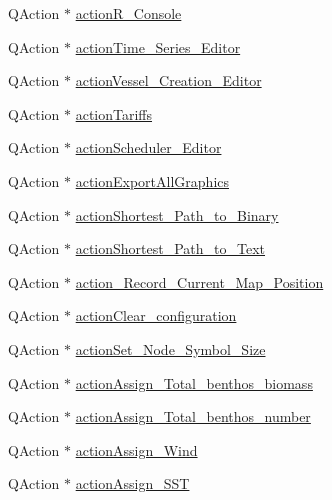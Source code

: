 \begin{DoxyCompactItemize}
\item 
Q\+Action $\ast$ \mbox{\hyperlink{class_ui___main_window_a132a1368e69983ae3fe5c0cb2d87704b}{action\+R\+\_\+\+Console}}
\item 
Q\+Action $\ast$ \mbox{\hyperlink{class_ui___main_window_a6eda9a1f26b29e60df9d0c9b6cfd4619}{action\+Time\+\_\+\+Series\+\_\+\+Editor}}
\item 
Q\+Action $\ast$ \mbox{\hyperlink{class_ui___main_window_a1153cec874e0809af0c2a92401f1992a}{action\+Vessel\+\_\+\+Creation\+\_\+\+Editor}}
\item 
Q\+Action $\ast$ \mbox{\hyperlink{class_ui___main_window_abfc0b361694c7613f551bd2fd69cc7d3}{action\+Tariffs}}
\item 
Q\+Action $\ast$ \mbox{\hyperlink{class_ui___main_window_a2f41da4d27897a949def5063cfaeb673}{action\+Scheduler\+\_\+\+Editor}}
\item 
Q\+Action $\ast$ \mbox{\hyperlink{class_ui___main_window_a9bb4a2e998e88eb450488b6a5260bce8}{action\+Export\+All\+Graphics}}
\item 
Q\+Action $\ast$ \mbox{\hyperlink{class_ui___main_window_aad24ec2e8eab1824841e8aa0f5b87a9f}{action\+Shortest\+\_\+\+Path\+\_\+to\+\_\+\+Binary}}
\item 
Q\+Action $\ast$ \mbox{\hyperlink{class_ui___main_window_a6509a76816bf801bfb93750973f6a878}{action\+Shortest\+\_\+\+Path\+\_\+to\+\_\+\+Text}}
\item 
Q\+Action $\ast$ \mbox{\hyperlink{class_ui___main_window_afaa08ad05b036e6672cf172424cea79d}{action\+\_\+\+Record\+\_\+\+Current\+\_\+\+Map\+\_\+\+Position}}
\item 
Q\+Action $\ast$ \mbox{\hyperlink{class_ui___main_window_a5ef1318a9ff022383c88327750b1318a}{action\+Clear\+\_\+configuration}}
\item 
Q\+Action $\ast$ \mbox{\hyperlink{class_ui___main_window_aa8902a1f75360341c879453c5e053893}{action\+Set\+\_\+\+Node\+\_\+\+Symbol\+\_\+\+Size}}
\item 
Q\+Action $\ast$ \mbox{\hyperlink{class_ui___main_window_ae5ee462918aeef0e0734ecb128eb2e61}{action\+Assign\+\_\+\+Total\+\_\+benthos\+\_\+biomass}}
\item 
Q\+Action $\ast$ \mbox{\hyperlink{class_ui___main_window_a044aefa7e8836f265f0b37c4d1e63e42}{action\+Assign\+\_\+\+Total\+\_\+benthos\+\_\+number}}
\item 
Q\+Action $\ast$ \mbox{\hyperlink{class_ui___main_window_aa277c91c1519ef0bb00d49e7cced878b}{action\+Assign\+\_\+\+Wind}}
\item 
Q\+Action $\ast$ \mbox{\hyperlink{class_ui___main_window_ad12460934cdbd2a28bdaaabe9e1ffc50}{action\+Assign\+\_\+\+S\+ST}}

\end{DoxyCompactItemize}

